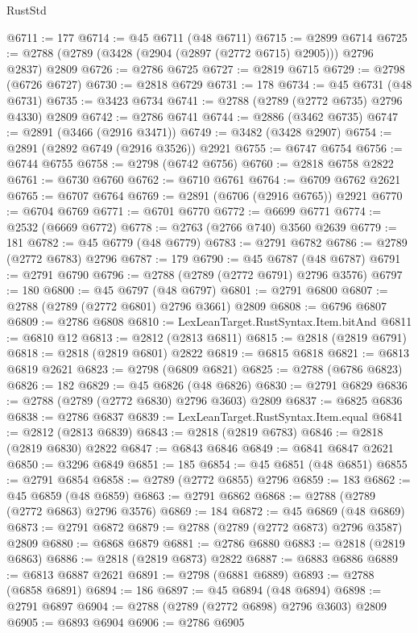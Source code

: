 \begin{lexlean}{RustStd}
\begin{coremodule}
@6711 := 177
@6714 := @45 @6711 (@48 @6711)
@6715 := @2899 @6714
@6725 := @2788 (@2789 (@3428 (@2904 (@2897 (@2772 @6715) @2905))) @2796 @2837) @2809
@6726 := @2786 @6725
@6727 := @2819 @6715
@6729 := @2798 (@6726 @6727)
@6730 := @2818 @6729
@6731 := 178
@6734 := @45 @6731 (@48 @6731)
@6735 := @3423 @6734
@6741 := @2788 (@2789 (@2772 @6735) @2796 @4330) @2809
@6742 := @2786 @6741
@6744 := @2886 (@3462 @6735)
@6747 := @2891 (@3466 (@2916 @3471))
@6749 := @3482 (@3428 @2907)
@6754 := @2891 (@2892 @6749 (@2916 @3526)) @2921
@6755 := @6747 @6754
@6756 := @6744 @6755
@6758 := @2798 (@6742 @6756)
@6760 := @2818 @6758 @2822
@6761 := @6730 @6760
@6762 := @6710 @6761
@6764 := @6709 @6762 @2621
@6765 := @6707 @6764
@6769 := @2891 (@6706 (@2916 @6765)) @2921
@6770 := @6704 @6769
@6771 := @6701 @6770
@6772 := @6699 @6771
@6774 := @2532 (@6669 @6772)
@6778 := @2763 (@2766 @740) @3560 @2639
@6779 := 181
@6782 := @45 @6779 (@48 @6779)
@6783 := @2791 @6782
@6786 := @2789 (@2772 @6783) @2796
@6787 := 179
@6790 := @45 @6787 (@48 @6787)
@6791 := @2791 @6790
@6796 := @2788 (@2789 (@2772 @6791) @2796 @3576)
@6797 := 180
@6800 := @45 @6797 (@48 @6797)
@6801 := @2791 @6800
@6807 := @2788 (@2789 (@2772 @6801) @2796 @3661) @2809
@6808 := @6796 @6807
@6809 := @2786 @6808
@6810 := LexLeanTarget.RustSyntax.Item.bitAnd
@6811 := @6810 @12
@6813 := @2812 (@2813 @6811)
@6815 := @2818 (@2819 @6791)
@6818 := @2818 (@2819 @6801) @2822
@6819 := @6815 @6818
@6821 := @6813 @6819 @2621
@6823 := @2798 (@6809 @6821)
@6825 := @2788 (@6786 @6823)
@6826 := 182
@6829 := @45 @6826 (@48 @6826)
@6830 := @2791 @6829
@6836 := @2788 (@2789 (@2772 @6830) @2796 @3603) @2809
@6837 := @6825 @6836
@6838 := @2786 @6837
@6839 := LexLeanTarget.RustSyntax.Item.equal
@6841 := @2812 (@2813 @6839)
@6843 := @2818 (@2819 @6783)
@6846 := @2818 (@2819 @6830) @2822
@6847 := @6843 @6846
@6849 := @6841 @6847 @2621
@6850 := @3296 @6849
@6851 := 185
@6854 := @45 @6851 (@48 @6851)
@6855 := @2791 @6854
@6858 := @2789 (@2772 @6855) @2796
@6859 := 183
@6862 := @45 @6859 (@48 @6859)
@6863 := @2791 @6862
@6868 := @2788 (@2789 (@2772 @6863) @2796 @3576)
@6869 := 184
@6872 := @45 @6869 (@48 @6869)
@6873 := @2791 @6872
@6879 := @2788 (@2789 (@2772 @6873) @2796 @3587) @2809
@6880 := @6868 @6879
@6881 := @2786 @6880
@6883 := @2818 (@2819 @6863)
@6886 := @2818 (@2819 @6873) @2822
@6887 := @6883 @6886
@6889 := @6813 @6887 @2621
@6891 := @2798 (@6881 @6889)
@6893 := @2788 (@6858 @6891)
@6894 := 186
@6897 := @45 @6894 (@48 @6894)
@6898 := @2791 @6897
@6904 := @2788 (@2789 (@2772 @6898) @2796 @3603) @2809
@6905 := @6893 @6904
@6906 := @2786 @6905

\end{coremodule}
\end{lexlean}
